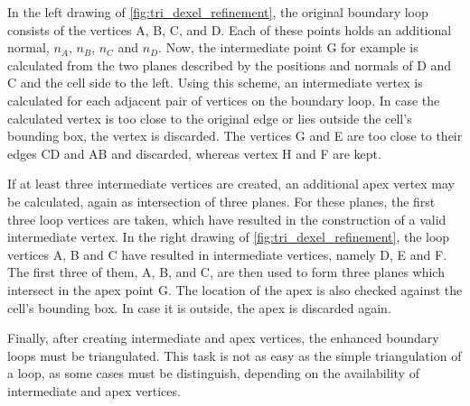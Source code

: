 In the left drawing of \cref{fig:tri_dexel_refinement}, the original boundary loop consists of the vertices A, B, C, and D.
Each of these points holds an additional normal, $n_A$, $n_B$, $n_C$ and $n_D$.
Now, the intermediate point G for example is calculated from the two planes described by the positions and normals of D and C and the cell side to the left.
Using this scheme, an intermediate vertex is calculated for each adjacent pair of vertices on the boundary loop.
In case the calculated vertex is too close to the original edge or lies outside the cell's bounding box, the vertex is discarded.
The vertices G and E are too close to their edges CD and AB and discarded, whereas vertex H and F are kept.

If at least three intermediate vertices are created, an additional apex vertex may be calculated, again as intersection of three planes.
For these planes, the first three loop vertices are taken, which have resulted in the construction of a valid intermediate vertex.
In the right drawing of \cref{fig:tri_dexel_refinement}, the loop vertices A, B and C have resulted in intermediate vertices, namely D, E and F.
The first three of them, A, B, and C, are then used to form three planes which intersect in the apex point G.
The location of the apex is also checked against the cell's bounding box.
In case it is outside, the apex is discarded again.

Finally, after creating intermediate and apex vertices, the enhanced boundary loops must be triangulated.
This task is not as easy as the simple triangulation of a loop, as some cases must be distinguish, depending on the availability of intermediate and apex vertices.


